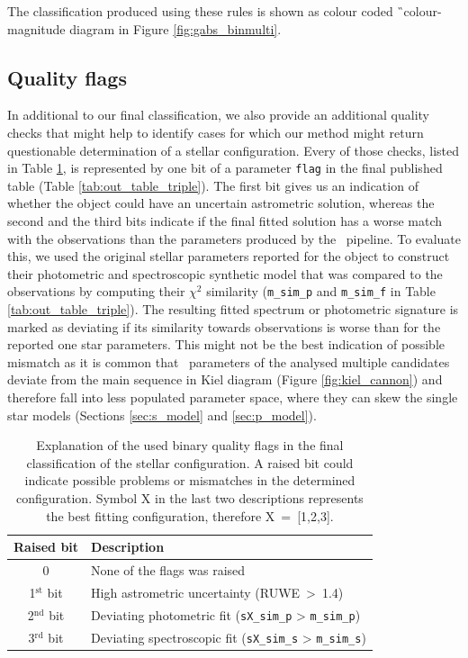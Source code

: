 The classification produced using these rules is shown as colour coded \G\ colour-magnitude diagram in Figure \ref{fig:gabs_binmulti}.

\subsection{Quality flags}
\label{sec:quaflags}
In additional to our final classification, we also provide an additional quality checks that might help to identify cases for which our method might return questionable determination of a stellar configuration. Every of those checks, listed in Table \ref{tab:q_flag}, is represented by one bit of a parameter \texttt{flag} in the final published table (Table \ref{tab:out_table_triple}). The first bit gives us an indication of whether the object could have an uncertain astrometric solution, whereas the second and the third bits indicate if the final fitted solution has a worse match with the observations than the parameters produced by the \TC\ pipeline. To evaluate this, we used the original stellar parameters reported for the object to construct their photometric and spectroscopic synthetic model that was compared to the observations by computing their $\chi^2$ similarity (\texttt{m\_sim\_p} and \texttt{m\_sim\_f} in Table \ref{tab:out_table_triple}). The resulting fitted spectrum or photometric signature is marked as deviating if its similarity towards observations is worse than for the reported one star parameters. This might not be the best indication of possible mismatch as it is common that \TC\ parameters of the analysed multiple candidates deviate from the main sequence in Kiel diagram (Figure \ref{fig:kiel_cannon}) and therefore fall into less populated parameter space, where they can skew the single star models (Sections \ref{sec:s_model} and \ref{sec:p_model}).

\begin{table}
	\centering
	\caption{Explanation of the used binary quality flags in the final classification of the stellar configuration. A raised bit could indicate possible problems or mismatches in the determined configuration. Symbol X in the last two descriptions represents the best fitting configuration, therefore X~=~[1,2,3].}
	\begin{tabular}{c l}
		\hline
		Raised bit & Description \\ 
		\hline
		0 & None of the flags was raised \\
		1$^{\text{st}}$ bit & High astrometric uncertainty (RUWE~>~1.4)\\
		2$^{\text{nd}}$ bit & Deviating photometric fit (\texttt{sX\_sim\_p} > \texttt{m\_sim\_p})\\
		3$^{\text{rd}}$ bit & Deviating spectroscopic fit (\texttt{sX\_sim\_s} > \texttt{m\_sim\_s})\\
		\hline
	\end{tabular}
	\label{tab:q_flag}
\end{table}

